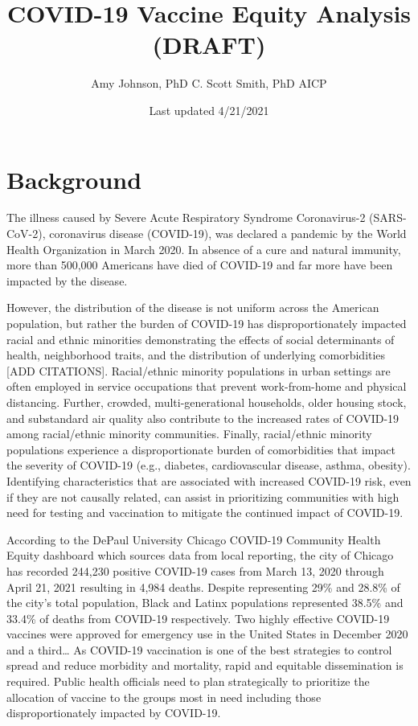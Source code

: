 \documentclass[
]{article}
\title{COVID-19 Vaccine Equity Analysis (DRAFT)}
\author{Amy Johnson, PhD \textbar{} C. Scott Smith, PhD AICP}
\date{Last updated 4/21/2021}
\begin{document}
\maketitle

{
\setcounter{tocdepth}{2}
\tableofcontents
}
\hypertarget{background}{%
\section{Background}\label{background}}

The illness caused by Severe Acute Respiratory Syndrome Coronavirus-2 (SARS-CoV-2), coronavirus disease (COVID-19), was declared a pandemic by the World Health Organization in March 2020. In absence of a cure and natural immunity, more than 500,000 Americans have died of COVID-19 and far more have been impacted by the disease.

However, the distribution of the disease is not uniform across the American population, but rather the burden of COVID-19 has disproportionately impacted racial and ethnic minorities demonstrating the effects of social determinants of health, neighborhood traits, and the distribution of underlying comorbidities {[}ADD CITATIONS{]}. Racial/ethnic minority populations in urban settings are often employed in service occupations that prevent work-from-home and physical distancing. Further, crowded, multi-generational households, older housing stock, and substandard air quality also contribute to the increased rates of COVID-19 among racial/ethnic minority communities. Finally, racial/ethnic minority populations experience a disproportionate burden of comorbidities that impact the severity of COVID-19 (e.g., diabetes, cardiovascular disease, asthma, obesity). Identifying characteristics that are associated with increased COVID-19 risk, even if they are not causally related, can assist in prioritizing communities with high need for testing and vaccination to mitigate the continued impact of COVID-19.

According to the DePaul University Chicago COVID-19 Community Health Equity dashboard which sources data from local reporting, the city of Chicago has recorded 244,230 positive COVID-19 cases from March 13, 2020 through April 21, 2021 resulting in 4,984 deaths. Despite representing 29\% and 28.8\% of the city's total population, Black and Latinx populations represented 38.5\% and 33.4\% of deaths from COVID-19 respectively. Two highly effective COVID-19 vaccines were approved for emergency use in the United States in December 2020 and a third\ldots{} As COVID-19 vaccination is one of the best strategies to control spread and reduce morbidity and mortality, rapid and equitable dissemination is required. Public health officials need to plan strategically to prioritize the allocation of vaccine to the groups most in need including those disproportionately impacted by COVID-19.
\end{document}
